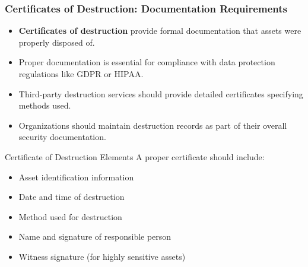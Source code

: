 \documentclass{beamer}
\begin{document}
\begin{frame}
\frametitle{Certificates of Destruction: Documentation Requirements}
\begin{itemize}
\item \textbf{Certificates of destruction} provide formal documentation that assets were properly disposed of.
\item Proper documentation is essential for compliance with data protection regulations like GDPR or HIPAA.
\item Third-party destruction services should provide detailed certificates specifying methods used.
\item Organizations should maintain destruction records as part of their overall security documentation.
\end{itemize}

\begin{alertblock}{Certificate of Destruction Elements}
    \scriptsize
A proper certificate should include:
\begin{itemize}
    \item Asset identification information
    \item Date and time of destruction
    \item Method used for destruction
    \item Name and signature of responsible person
    \item Witness signature (for highly sensitive assets)
\end{itemize}
\end{alertblock}
\end{frame}
\end{document}
